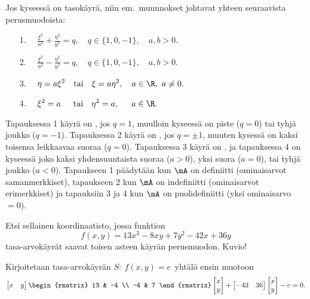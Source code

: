 Jos kyseessä on tasokäyrä, niin em.\ muunnokset johtavat yhteen seuraavista perusmuodoista:
\begin{itemize}
\item[1.] $\displaystyle{\quad \frac{\xi^2}{a^2}+\frac{\eta^2}{b^2}=q, \quad 
                                            q\in\{1,0,-1\}, \quad a,b>0.}$ \\[2mm]
\item[2.] $\displaystyle{\quad \frac{\xi^2}{a^2}-\frac{\eta^2}{b^2}=q, \quad 
                                            q\in\{1,0,-1\}, \quad a,b>0.}$ \\[2mm]
\item[3.] $\displaystyle{\quad \eta=a\xi^2 \quad \text{tai} \quad \xi=a\eta^2, \quad 
                                            a\in\R,\ a\neq 0.}$ \\[2mm]
\item[4.] $\displaystyle{\quad \xi^2=a \quad\,\ \text{tai} \quad \eta^2=a, \quad\,\ a\in\R.}$
\end{itemize}
Tapauksessa 1 käyrä on , jos $q=1$, muulloin kyseessä on piste ($q=0$) tai tyhjä
joukko ($q=-1$). Tapauksessa 2 käyrä on , jos $q=\pm 1$, muuten kysessä on kaksi
toisensa leikkaavaa suoraa ($q=0$). Tapauksessa 3 käyrä on , ja tapauksessa 4 on
kyseessä joko kaksi yhdensuuntaista suoraa ($a>0$), yksi suora ($a=0$), tai tyhjä joukko 
($a<0$). Tapaukseen 1 päädytään kun $\mA$ on definiitti (ominaisarvot samanmerkkiset),
tapaukseen 2 kun $\mA$ on indefiniitti (ominaisarvot erimerkkiset) ja tapauksiin 3 ja 4 kun
$\mA$ on puolidefiniitti (yksi ominaisarvo $=0$).
\begin{Exa}
Etsi sellainen koordinaatisto, jossa funktion
\[
f(x,y)=13x^2-8xy+7y^2-42x+36y
\]
tasa-arvokäyrät saavat toisen asteen käyrän perusmuodon. Kuvio!
\end{Exa}
\ratk Kirjoitetaan tasa-arvokäyrän $S:\ f(x,y)=c\,$ yhtälö ensin muotoon
\[
\begin{bmatrix} x&y \end{bmatrix}
\begin{rmatrix} 13 & -4 \\ -4 & 7 \end{rmatrix}
\begin{bmatrix} x\\y \end{bmatrix}
+ \begin{bmatrix} -42&36 \end{bmatrix} \begin{bmatrix} x\\y \end{bmatrix} - c = 0.
\]
